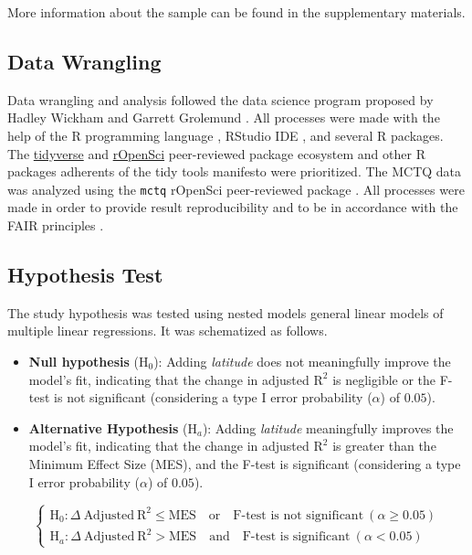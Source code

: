 \documentclass[
12pt,
openright,
oneside,
a4paper,
chapter=TITLE,
section=TITLE,
french,
spanish,
brazil,
english
]{abntex2}
\begin{document}
More information about the sample can be found in the supplementary
materials.

\subsection{Data Wrangling}\label{data-wrangling}

Data wrangling and analysis followed the data science program proposed
by Hadley Wickham and Garrett Grolemund \autocite{wickham2016}. All
processes were made with the help of the R programming language
\autocite{rcoreteam}, RStudio IDE \autocite{positteam}, and several R
packages. The \href{https://www.tidyverse.org/}{tidyverse} and
\href{https://ropensci.org/}{rOpenSci} peer-reviewed package ecosystem
and other R packages adherents of the tidy tools manifesto
\autocite{wickham2023} were prioritized. The MCTQ data was analyzed
using the \texttt{mctq} rOpenSci peer-reviewed package
\autocite{vartaniana}. All processes were made in order to provide
result reproducibility and to be in accordance with the FAIR principles
\autocite{wilkinson2016}.

\subsection{Hypothesis Test}\label{hypothesis-test}

The study hypothesis was tested using nested models general linear
models of multiple linear regressions. It was schematized as follows.

\begin{itemize}
\item
  \textbf{Null hypothesis} (\(\text{H}_{0}\)): Adding \emph{latitude}
  does not meaningfully improve the model's fit, indicating that the
  change in adjusted \(\text{R}^{2}\) is negligible or the F-test is not
  significant (considering a type I error probability (\(\alpha\)) of
  \(0.05\)).
\item
  \textbf{Alternative Hypothesis} (\(\text{H}_{a}\)): Adding
  \emph{latitude} meaningfully improves the model's fit, indicating that
  the change in adjusted \(\text{R}^{2}\) is greater than the Minimum
  Effect Size (MES), and the F-test is significant (considering a type I
  error probability (\(\alpha\)) of \(0.05\)).
\end{itemize}

\[
\begin{cases}
\text{H}_{0}: \Delta \ \text{Adjusted} \ \text{R}^{2} \leq \text{MES} \quad \text{or} \quad \text{F-test is not significant} \ (\alpha \geq 0.05) \\
\text{H}_{a}: \Delta \ \text{Adjusted} \ \text{R}^{2} > \text{MES} \quad \text{and} \quad \text{F-test is significant} \ (\alpha < 0.05)
\end{cases}
\]
\end{document}
